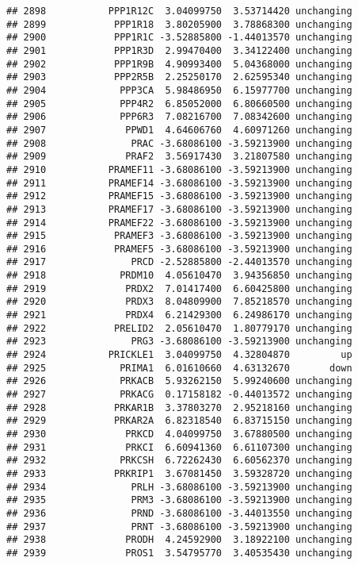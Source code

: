 \documentclass[]{article}
\begin{document}
\begin{verbatim}
## 2898           PPP1R12C  3.04099750  3.53714420 unchanging
## 2899            PPP1R18  3.80205900  3.78868300 unchanging
## 2900            PPP1R1C -3.52885800 -1.44013570 unchanging
## 2901            PPP1R3D  2.99470400  3.34122400 unchanging
## 2902            PPP1R9B  4.90993400  5.04368000 unchanging
## 2903            PPP2R5B  2.25250170  2.62595340 unchanging
## 2904             PPP3CA  5.98486950  6.15977700 unchanging
## 2905             PPP4R2  6.85052000  6.80660500 unchanging
## 2906             PPP6R3  7.08216700  7.08342600 unchanging
## 2907              PPWD1  4.64606760  4.60971260 unchanging
## 2908               PRAC -3.68086100 -3.59213900 unchanging
## 2909              PRAF2  3.56917430  3.21807580 unchanging
## 2910           PRAMEF11 -3.68086100 -3.59213900 unchanging
## 2911           PRAMEF14 -3.68086100 -3.59213900 unchanging
## 2912           PRAMEF15 -3.68086100 -3.59213900 unchanging
## 2913           PRAMEF17 -3.68086100 -3.59213900 unchanging
## 2914           PRAMEF22 -3.68086100 -3.59213900 unchanging
## 2915            PRAMEF3 -3.68086100 -3.59213900 unchanging
## 2916            PRAMEF5 -3.68086100 -3.59213900 unchanging
## 2917               PRCD -2.52885800 -2.44013570 unchanging
## 2918             PRDM10  4.05610470  3.94356850 unchanging
## 2919              PRDX2  7.01417400  6.60425800 unchanging
## 2920              PRDX3  8.04809900  7.85218570 unchanging
## 2921              PRDX4  6.21429300  6.24986170 unchanging
## 2922            PRELID2  2.05610470  1.80779170 unchanging
## 2923               PRG3 -3.68086100 -3.59213900 unchanging
## 2924           PRICKLE1  3.04099750  4.32804870         up
## 2925             PRIMA1  6.01610660  4.63132670       down
## 2926             PRKACB  5.93262150  5.99240600 unchanging
## 2927             PRKACG  0.17158182 -0.44013572 unchanging
## 2928            PRKAR1B  3.37803270  2.95218160 unchanging
## 2929            PRKAR2A  6.82318540  6.83715150 unchanging
## 2930              PRKCD  4.04099750  3.67880500 unchanging
## 2931              PRKCI  6.60941360  6.61107300 unchanging
## 2932             PRKCSH  6.72262430  6.60562370 unchanging
## 2933            PRKRIP1  3.67081450  3.59328720 unchanging
## 2934               PRLH -3.68086100 -3.59213900 unchanging
## 2935               PRM3 -3.68086100 -3.59213900 unchanging
## 2936               PRND -3.68086100 -3.44013550 unchanging
## 2937               PRNT -3.68086100 -3.59213900 unchanging
## 2938              PRODH  4.24592900  3.18922100 unchanging
## 2939              PROS1  3.54795770  3.40535430 unchanging

\end{verbatim}
\end{document}
